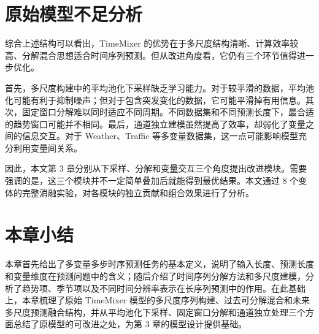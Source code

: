 \section{原始模型不足分析}

综合上述结构可以看出，TimeMixer 的优势在于多尺度结构清晰、计算效率较高、分解混合思想适合时间序列预测。但从改进角度看，它仍有三个环节值得进一步优化。

首先，多尺度构建中的平均池化下采样缺乏学习能力。对于较平滑的数据，平均池化可能有利于抑制噪声；但对于包含突发变化的数据，它可能平滑掉有用信息。其次，固定窗口分解难以同时适应不同周期。不同数据集和不同预测长度下，最合适的趋势窗口可能并不相同。最后，通道独立建模虽然提高了效率，却弱化了变量之间的信息交互。对于 Weather、Traffic 等多变量数据集，这一点可能影响模型充分利用变量间关系。

因此，本文第 3 章分别从下采样、分解和变量交互三个角度提出改进模块。需要强调的是，这三个模块并不一定简单叠加后就能得到最优结果。本文通过 8 个变体的完整消融实验，对各模块的独立贡献和组合效果进行了分析。

\section{本章小结}

本章首先给出了多变量多步时序预测任务的基本定义，说明了输入长度、预测长度和变量维度在预测问题中的含义；随后介绍了时间序列分解方法和多尺度建模，分析了趋势项、季节项以及不同时间分辨率表示在长序列预测中的作用。在此基础上，本章梳理了原始 TimeMixer 模型的多尺度序列构建、过去可分解混合和未来多尺度预测融合结构，并从平均池化下采样、固定窗口分解和通道独立处理三个方面总结了原模型的可改进之处，为第 3 章的模型设计提供基础。
